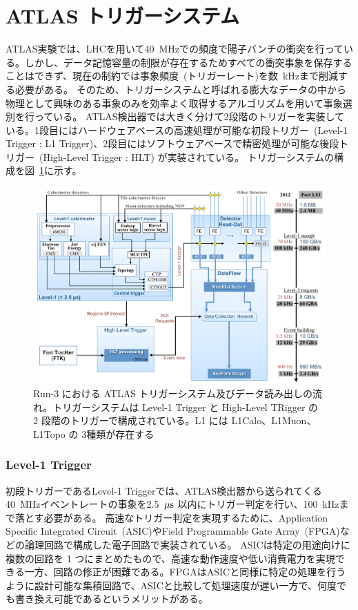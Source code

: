 \section{ATLAS トリガーシステム}
ATLAS実験では、LHCを用いて40~MHzでの頻度で陽子バンチの衝突を行っている。しかし、データ記憶容量の制限が存在するためすべての衝突事象を保存することはできず、現在の制約では事象頻度~(トリガーレート)を数~kHzまで削減する必要がある。
そのため、トリガーシステムと呼ばれる膨大なデータの中から物理として興味のある事象のみを効率よく取得するアルゴリズムを用いて事象選別を行っている。
ATLAS検出器では大きく分けて2段階のトリガーを実装している。1段目にはハードウェアベースの高速処理が可能な初段トリガー~(Level-1 Trigger : L1 Trigger)、2段目にはソフトウェアベースで精密処理が可能な後段トリガー~(High-Level Trigger : HLT) が実装されている。
トリガーシステムの構成を図~\ref{fig:トリガーの全体像}に示す。

\begin{figure}[tb]
  \centering
  \includegraphics[clip, width=14cm]{fig/3/trigger-nagare2.pdf}
  \caption{Run-3 における ATLAS トリガーシステム及びデータ読み出しの流れ\cite{article:Run3trigger}。トリガーシステムは Level-1 Trigger と High-Level TRigger の 2 段階のトリガーで構成されている。L1 には L1Calo、L1Muon、L1Topo の 3種類が存在する}
  \label{fig:トリガーの全体像}
\end{figure}

\subsubsection{Level-1 Trigger}\label{L1Topo}
初段トリガーであるLevel-1 Triggerでは、ATLAS検出器から送られてくる40~MHzイベントレートの事象を2.5~$\rm{\mu s}$ 以内にトリガー判定を行い、100~kHzまで落とす必要がある。
高速なトリガー判定を実現するために、Application Specific Integrated Circuit~(ASIC)やField Programmable Gate Array~(FPGA)などの論理回路で構成した電子回路で実装されている。
ASICは特定の用途向けに複数の回路を 1 つにまとめたもので、高速な動作速度や低い消費電力を実現できる一方、回路の修正が困難である。FPGAはASICと同様に特定の処理を行うように設計可能な集積回路で、ASICと比較して処理速度が遅い一方で、何度でも書き換え可能であるというメリットがある。

